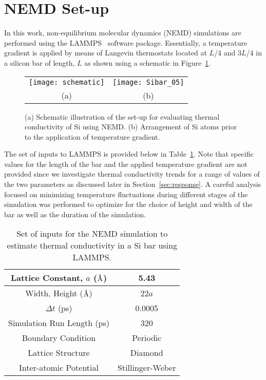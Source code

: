 \section{NEMD Set-up}
\label{sec:setup}

In this work, non-equilibrium molecular dynamics (NEMD) simulations are performed using the 
LAMMPS~\cite{Plimpton:2007} software package.
Essentially, a temperature gradient is applied by means of Langevin thermostats located
at $L$/4 and $3L$/4 in a silicon bar of length, $L$ 
as shown using a schematic in Figure~\ref{fig:setup}. 

\begin{figure}[htbp]
\begin{center}
\begin{tabular}{cc}
  \texttt{[image: schematic]}
  &
  \hspace{3mm}
  \texttt{[image: Sibar\_05]}
  \\ (a) & (b)
  \end{tabular}
\caption{(a) Schematic illustration of the set-up for evaluating thermal conductivity of Si using NEMD. (b) 
Arrangement of Si atoms prior to the application of temperature gradient.}
\label{fig:setup}
\end{center}
\end{figure}

The set of
inputs to LAMMPS is provided below in Table~\ref{tab:input}. Note that specific values for the length of the bar
and the applied temperature gradient are not provided since we investigate thermal conductivity trends for a range of 
values of the two parameters as discussed later in Section~\ref{sec:response}. A careful analysis focused on
minimizing temperature fluctuations during different stages of the simulation was performed to optimize for the
choice of height and width of the bar as well as the duration of the simulation. 

\begin{table}[htbp]
\begin{center}
\begin{tabular}{|c||c|}
\hline
Lattice Constant, $a$ ($\mbox{\normalfont\AA}$) & 5.43 \\ \hline
Width, Height ($\mbox{\normalfont\AA}$) & 22$a$ \\ \hline
$\Delta t$  (ps) & 0.0005 \\ \hline
Simulation Run Length (ps) & 320 \\ \hline
Boundary Condition & Periodic \\ \hline
Lattice Structure & Diamond \\ \hline
Inter-atomic Potential & Stillinger-Weber \\ 
\hline
\end{tabular}
\end{center}
\label{tab:input}
\caption{Set of inputs for the NEMD simulation to estimate thermal conductivity in a Si bar using LAMMPS.}
\end{table}

